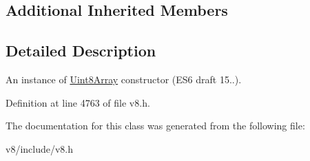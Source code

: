 \subsection*{Additional Inherited Members}


\subsection{Detailed Description}
An instance of \mbox{\hyperlink{classv8_1_1Uint8Array}{Uint8\+Array}} constructor (E\+S6 draft 15..). 

Definition at line 4763 of file v8.\+h.



The documentation for this class was generated from the following file\+:\begin{DoxyCompactItemize}
\item 
v8/include/v8.\+h\end{DoxyCompactItemize}
